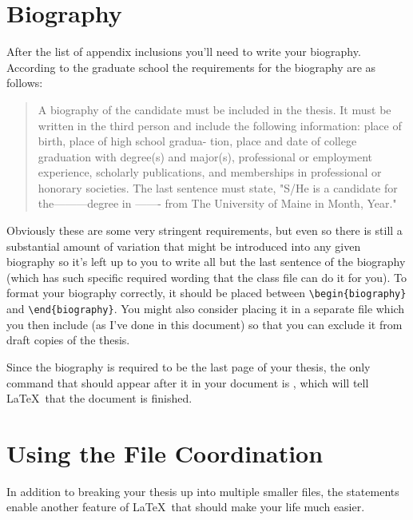 \section{Biography}\label{bio}
After the list of appendix inclusions you'll need to write your biography.  According to the graduate school the requirements for the biography are as follows:
\begin{quote}
A biography of the candidate must be included in the thesis.  It must  be written in the 
third person and include the following information:  place of birth, place of high school gradua- 
tion, place and date of college graduation with degree(s) and major(s), professional or 
employment experience, scholarly publications, and memberships in professional or honorary 
societies.  The last sentence must state, "S/He is a candidate for the---------degree in ------- from 
The University of Maine in Month, Year."
\end{quote}
Obviously these are some very stringent requirements, but even so there is still a substantial amount of variation that might be introduced into any given biography so it's left up to you to write all but the last sentence of the biography (which has such specific required wording that the class file can do it for you).  To format your biography correctly, it should be placed between \verb=\begin{biography}= and \verb=\end{biography}=.  You might also consider placing it in a separate file which you then include (as I've done in this document) so that you can exclude it from draft copies of the thesis.

Since the biography is required to be the last page of your thesis, the only command that should appear after it in your document is \verb==, which will tell \LaTeX\ that the document is finished.


\section{Using the File Coordination}\label{coord}

In addition to breaking your thesis up into multiple smaller files, the \verb== statements enable another feature of \LaTeX\ that should make your life much easier.

